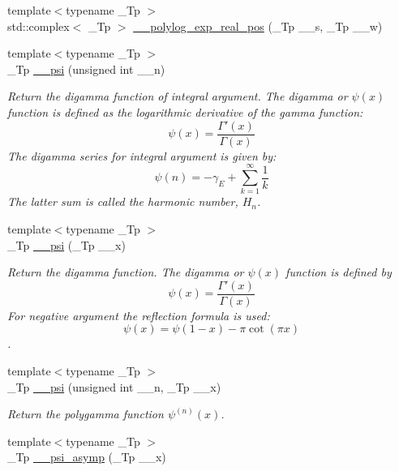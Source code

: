 \begin{DoxyCompactItemize}
\item 
{\footnotesize template$<$typename \+\_\+\+Tp $>$ }\\std\+::complex$<$ \+\_\+\+Tp $>$ \hyperlink{namespacestd_1_1____detail_ad77bb9953443dfb1575a61a4573c6913}{\+\_\+\+\_\+polylog\+\_\+exp\+\_\+real\+\_\+pos} (\+\_\+\+Tp \+\_\+\+\_\+s, \+\_\+\+Tp \+\_\+\+\_\+w)
\item 
{\footnotesize template$<$typename \+\_\+\+Tp $>$ }\\\+\_\+\+Tp \hyperlink{namespacestd_1_1____detail_a664d83a211283d0975ba40f3874c2d70}{\+\_\+\+\_\+psi} (unsigned int \+\_\+\+\_\+n)
\begin{DoxyCompactList}\small\item\em Return the digamma function of integral argument. The digamma or $ \psi(x) $ function is defined as the logarithmic derivative of the gamma function\+: \[ \psi(x) = \frac{\Gamma'(x)}{\Gamma(x)} \] The digamma series for integral argument is given by\+: \[ \psi(n) = -\gamma_E + \sum_{k=1}^{\infty} \frac{1}{k} \] The latter sum is called the harmonic number, $ H_n $. \end{DoxyCompactList}\item 
{\footnotesize template$<$typename \+\_\+\+Tp $>$ }\\\+\_\+\+Tp \hyperlink{namespacestd_1_1____detail_ad7246a3ca90be800e6cc79c8e2360abd}{\+\_\+\+\_\+psi} (\+\_\+\+Tp \+\_\+\+\_\+x)
\begin{DoxyCompactList}\small\item\em Return the digamma function. The digamma or $ \psi(x) $ function is defined by \[ \psi(x) = \frac{\Gamma'(x)}{\Gamma(x)} \] For negative argument the reflection formula is used\+: \[ \psi(x) = \psi(1-x) - \pi \cot(\pi x) \]. \end{DoxyCompactList}\item 
{\footnotesize template$<$typename \+\_\+\+Tp $>$ }\\\+\_\+\+Tp \hyperlink{namespacestd_1_1____detail_a96d6b8301ca54615364a53665b347f6c}{\+\_\+\+\_\+psi} (unsigned int \+\_\+\+\_\+n, \+\_\+\+Tp \+\_\+\+\_\+x)
\begin{DoxyCompactList}\small\item\em Return the polygamma function $ \psi^{(n)}(x) $. \end{DoxyCompactList}\item 
{\footnotesize template$<$typename \+\_\+\+Tp $>$ }\\\+\_\+\+Tp \hyperlink{namespacestd_1_1____detail_a2557b5d815b6667bc9228c1e8a2a16ae}{\+\_\+\+\_\+psi\+\_\+asymp} (\+\_\+\+Tp \+\_\+\+\_\+x)

\end{DoxyCompactItemize}
